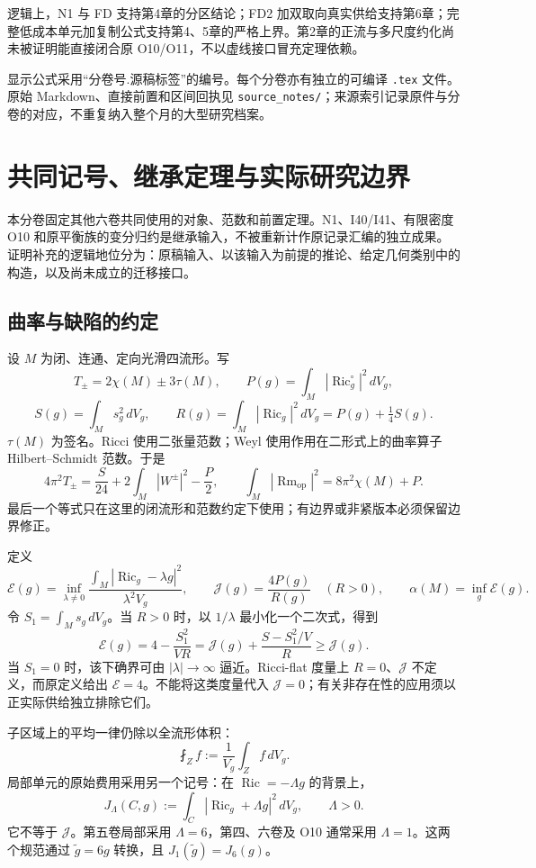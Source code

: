 \documentclass[UTF8,11pt,openany,fontset=none]{ctexbook}
\theoremstyle{definition}
\theoremstyle{remark}
\begin{document}
逻辑上，N1 与 FD 支持第4章的分区结论；FD2 加双取向真实供给支持第6章；完整低成本单元加复制公式支持第4、5章的严格上界。第2章的正流与多尺度约化尚未被证明能直接闭合原 O10/O11，不以虚线接口冒充定理依赖。

显示公式采用“分卷号.源稿标签”的编号。每个分卷亦有独立的可编译 \texttt{.tex} 文件。原始 Markdown、直接前置和区间回执见 \texttt{source\_notes/}；来源索引记录原件与分卷的对应，不重复纳入整个月的大型研究档案。

\tableofcontents
\mainmatter

\chapter{共同记号、继承定理与实际研究边界}
本分卷固定其他六卷共同使用的对象、范数和前置定理。N1、I40/I41、有限密度 O10 和原平衡族的变分归约是继承输入，不被重新计作原记录汇编的独立成果。证明补充的逻辑地位分为：原稿输入、以该输入为前提的推论、给定几何类别中的构造，以及尚未成立的迁移接口。\cite{I01,I02,B01}

\section{曲率与缺陷的约定}\label{v1-ux66f2ux7387ux4e0eux7f3aux9677ux7684ux7ea6ux5b9a}

设 \(M\) 为闭、连通、定向光滑四流形。写 \[
 T_\pm=2\chi(M)\pm3\tau(M),\qquad
 P(g)=\int_M|\operatorname{Ric}^{\circ}_g|^2\,dV_g,
\] \[
 S(g)=\int_Ms_g^2\,dV_g,\qquad
 R(g)=\int_M|\operatorname{Ric}_g|^2\,dV_g=P(g)+\tfrac14S(g).
\] \(\tau(M)\) 为签名。Ricci 使用二张量范数；Weyl 使用作用在二形式上的曲率算子 Hilbert--Schmidt 范数。于是 \[
 4\pi^2T_\pm=\frac{S}{24}+2\int_M|W^\pm|^2-\frac P2,
 \qquad
 \int_M|\operatorname{Rm}_{\mathrm{op}}|^2=8\pi^2\chi(M)+P.
\tag{1.1}
\] 最后一个等式只在这里的闭流形和范数约定下使用；有边界或非紧版本必须保留边界修正。

定义 \[
 \mathcal E(g)=\inf_{\lambda\ne0}
 \frac{\int_M|\operatorname{Ric}_g-\lambda g|^2}
 {\lambda^2 V_g},\qquad
 \mathcal J(g)=\frac{4P(g)}{R(g)}\quad(R>0),\qquad
 \alpha(M)=\inf_g\mathcal E(g).
\] 令 \(S_1=\int_Ms_g\,dV_g\)。当 \(R>0\) 时，以 \(1/\lambda\) 最小化一个二次式，得到 \[
 \mathcal E(g)=4-\frac{S_1^2}{VR}
 =\mathcal J(g)+\frac{S-S_1^2/V}{R}\ge\mathcal J(g).
\tag{1.2}
\] 当 \(S_1=0\) 时，该下确界可由 \(|\lambda|\to\infty\) 逼近。Ricci-flat 度量上 \(R=0\)、\(\mathcal J\) 不定义，而原定义给出 \(\mathcal E=4\)。不能将这类度量代入 \(\mathcal J=0\)；有关非存在性的应用须以正实际供给独立排除它们。

子区域上的平均一律仍除以全流形体积： \[
 \fint_Z f:=\frac1{V_g}\int_Z f\,dV_g.
\] 局部单元的原始费用采用另一个记号：在 \(\operatorname{Ric}=-\Lambda g\) 的背景上， \[
 J_\Lambda(C,g):=\int_C|\operatorname{Ric}_g+\Lambda g|^2\,dV_g,
 \qquad\Lambda>0.
\] 它不等于 \(\mathcal J\)。第五卷局部采用 \(\Lambda=6\)，第四、六卷及 O10 通常采用 \(\Lambda=1\)。这两个规范通过 \(\widetilde g=6g\) 转换，且 \(J_1(\widetilde g)=J_6(g)\)。
\end{document}
